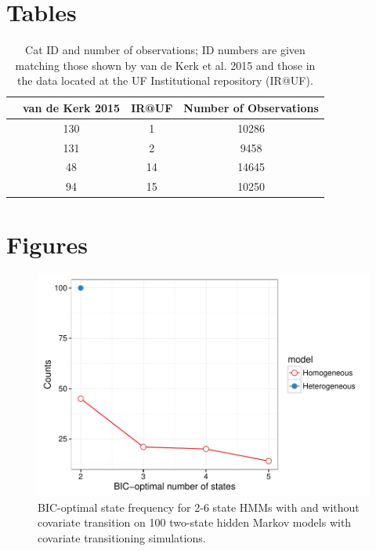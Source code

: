 \documentclass{bmcart}
\begin{document}
\begin{backmatter}

\section*{Tables}
\begin{table}[h!]
\caption{Cat ID and number of observations; ID numbers are given matching
those shown by van de Kerk et al. 2015 and those 
in the data located at the UF Institutional repository (IR@UF).}
\begin{tabular}{cccc}
  \hline
  & van de Kerk 2015  & IR@UF   & Number of Observations\\ \hline
  & 130 & 1 & 10286\\
  & 131 & 2  & 9458\\
  & 48 & 14  & 14645\\
  & 94  & 15   & 10250\\ \hline
\end{tabular}
\end{table}


\section*{Figures}
  \begin{figure}[h!]
   \includegraphics[width=5in]{figure/sim_results-1}
  \caption{ BIC-optimal state frequency for 2-6 state HMMs with and without covariate transition on 100 two-state hidden Markov models with covariate transitioning simulations.}
      \end{figure}


\end{backmatter}
\end{document}
